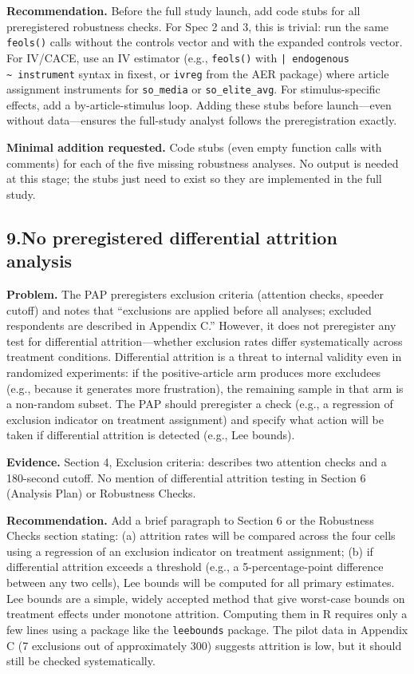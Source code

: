 \documentclass[11pt]{article}
\begin{document}
\textbf{Recommendation.} Before the full study launch, add code stubs for all preregistered robustness checks. For Spec 2 and 3, this is trivial: run the same \texttt{feols()} calls without the controls vector and with the expanded controls vector. For IV/CACE, use an IV estimator (e.g., \texttt{feols()} with \texttt{| endogenous \textasciitilde\ instrument} syntax in fixest, or \texttt{ivreg} from the AER package) where article assignment instruments for \texttt{so\_media} or \texttt{so\_elite\_avg}. For stimulus-specific effects, add a by-article-stimulus loop. Adding these stubs before launch---even without data---ensures the full-study analyst follows the preregistration exactly.

\textbf{Minimal addition requested.} Code stubs (even empty function calls with comments) for each of the five missing robustness analyses. No output is needed at this stage; the stubs just need to exist so they are implemented in the full study.

\bigskip

\subsection*{9.\enspace No preregistered differential attrition analysis}

\textbf{Problem.} The PAP preregisters exclusion criteria (attention checks, speeder cutoff) and notes that ``exclusions are applied before all analyses; excluded respondents are described in Appendix C.'' However, it does not preregister any test for differential attrition---whether exclusion rates differ systematically across treatment conditions. Differential attrition is a threat to internal validity even in randomized experiments: if the positive-article arm produces more excludees (e.g., because it generates more frustration), the remaining sample in that arm is a non-random subset. The PAP should preregister a check (e.g., a regression of exclusion indicator on treatment assignment) and specify what action will be taken if differential attrition is detected (e.g., Lee bounds).

\textbf{Evidence.} Section 4, Exclusion criteria: describes two attention checks and a 180-second cutoff. No mention of differential attrition testing in Section 6 (Analysis Plan) or Robustness Checks.

\textbf{Recommendation.} Add a brief paragraph to Section 6 or the Robustness Checks section stating: (a) attrition rates will be compared across the four cells using a regression of an exclusion indicator on treatment assignment; (b) if differential attrition exceeds a threshold (e.g., a 5-percentage-point difference between any two cells), Lee bounds will be computed for all primary estimates. Lee bounds are a simple, widely accepted method that give worst-case bounds on treatment effects under monotone attrition. Computing them in R requires only a few lines using a package like the \texttt{leebounds} package. The pilot data in Appendix C (7 exclusions out of approximately 300) suggests attrition is low, but it should still be checked systematically.
\end{document}
